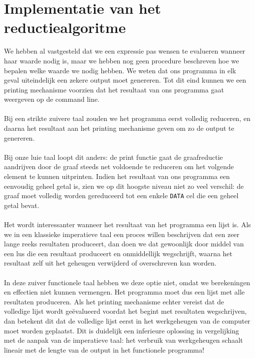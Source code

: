 \documentclass[a4paper,10pt]{article}
\begin{document}
\section{Implementatie van het reductiealgoritme}
We hebben al vastgesteld dat we een expressie pas wensen te evalueren wanneer haar waarde nodig is, maar we hebben nog geen procedure beschreven hoe we bepalen welke waarde we nodig hebben.
We weten dat ons programma in elk geval uiteindelijk een zekere output moet genereren.
Tot dit eind kunnen we een printing mechanisme voorzien dat het resultaat van ons programma gaat weergeven op de command line.
\paragraph{}
Bij een strikte zuivere taal zouden we het programma eerst volledig reduceren, en daarna het resultaat aan het printing mechanisme geven om zo de output te genereren.
\paragraph{}
Bij onze luie taal loopt dit anders: de print functie gaat de graafreductie aandrijven door de graaf steeds net voldoende te reduceren om het volgende element te kunnen uitprinten.
Indien het resultaat van ons programma een eenvoudig geheel getal is, zien we op dit hoogste niveau niet zo veel verschil: de graaf moet volledig worden gereduceerd tot een enkele \texttt{DATA} cel die een geheel getal bevat.
\paragraph{}
Het wordt interessanter wanneer het resultaat van het programma een lijst is.
Als we in een klassieke imperatieve taal een proces willen beschrijven dat een zeer lange reeks resultaten produceert, dan doen we dat gewoonlijk door middel van een lus die een resultaat produceert en onmiddellijk wegschrijft, waarna het resultaat zelf uit het geheugen verwijderd of overschreven kan worden.
\paragraph{}
In deze zuiver functionele taal hebben we deze optie niet, omdat we berekeningen en effectien niet kunnen vermengen.
Het programma moet dus een lijst met alle resultaten produceren.
Als het printing mechanisme echter vereist dat de volledige lijst wordt ge{\"e}valueerd voordat het begint met resultaten wegschrijven, dan betekent dit dat de volledige lijst eerst in het werkgeheugen van de computer moet worden geplaatst.
Dit is duidelijk een inferieure oplossing in vergelijking met de aanpak van de imperatieve taal: het verbruik van werkgeheugen schaalt lineair met de lengte van de output in het functionele programma!
\end{document}

